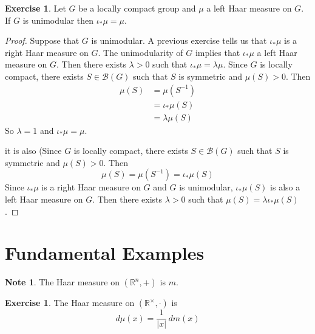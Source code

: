 \documentclass{book}
\theoremstyle{definition}
\newtheorem{note}[definition]{Note}
\newtheorem{ex}[definition]{Exercise}
\newcommand{\lam}{\lambda}
\newcommand{\R}{\mathbb{R}}
\newcommand{\MB}{\mathcal{B}}
\newcommand{\lex}[1]{\label{ex:#1}}
\DeclareMathOperator*{\0}{\mbf{0}}
\DeclareMathOperator*{\1}{\mbf{1}}
\newcommand{\dm}{\, d m}
\begin{document}
	\begin{ex} \lex{00000} 
		Let $G$ be a locally compact group and $\mu$ a left Haar measure on $G$. If $G$ is unimodular then $\iota_*\mu = \mu$.
	\end{ex}

	\begin{proof}
		Suppose that $G$ is unimodular. A previous exercise tells us that $\iota_*\mu$ is a right Haar measure on $G$. The unimodularity of $G$ implies that $\iota_*\mu$ a left Haar measure on $G$. Then there exists $\lam >0$ such that $\iota_*\mu = \lam \mu$. Since $G$ is locally compact, there exists $S \in \MB(G)$ such that $S$ is symmetric and $\mu(S) > 0$. Then 
		\begin{align*}
			\mu(S) 
			& = \mu(S^{-1}) \\
			& = \iota_*\mu(S) \\
			& = \lam \mu(S) 
		\end{align*}	
		So $\lam = 1$ and $\iota_*\mu = \mu$.

		it is also (Since $G$ is locally compact, there exists $S \in \MB(G)$ such that $S$ is symmetric and $\mu(S) > 0$. Then 
		$$\mu(S) = \mu(S^{-1}) = \iota_*\mu(S)$$ Since $\iota_*\mu$ is a right Haar measure on $G$ and $G$ is unimodular, $\iota_*\mu(S)$ is also a left Haar measure on $G$. Then there exists $\lam > 0$ such that $\mu(S) = \lam\iota_*\mu(S)$.
	\end{proof}




	
	



	
	
	
	
	
	
	
	\newpage
	\section{Fundamental Examples}		
	
	\begin{note}
		The Haar measure on  $(\R^n, +)$ is $m$.
	\end{note}
	
	\begin{ex} \lex{00000} 
		The Haar measure on $(\R^{\times}, \cdot)$  is $$d\mu(x) = \frac{1}{|x|} \dm(x)$$
	\end{ex}
\end{document}
